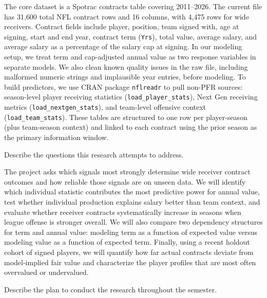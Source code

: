 \documentclass[10pt]{extarticle}
\begin{document}
\noindent The core dataset is a Spotrac contracts table covering 2011--2026. The current file has 31{,}600 total NFL contract rows and 16 columns, with 4{,}475 rows for wide receivers. Contract fields include player, position, team signed with, age at signing, start and end year, contract term (\texttt{Yrs}), total value, average salary, and average salary as a percentage of the salary cap at signing. In our modeling setup, we treat term and cap-adjusted annual value as two response variables in separate models. We also clean known quality issues in the raw file, including malformed numeric strings and implausible year entries, before modeling. To build predictors, we use CRAN package \texttt{nflreadr} to pull non-PFR sources: season-level player receiving statistics (\texttt{load\_player\_stats}), Next Gen receiving metrics (\texttt{load\_nextgen\_stats}), and team-level offensive context (\texttt{load\_team\_stats}). These tables are structured to one row per player-season (plus team-season context) and linked to each contract using the prior season as the primary information window.

\begin{problem}
[IV. Questions]
Describe the questions this research attempts to address.
\end{problem}

\noindent The project asks which signals most strongly determine wide receiver contract outcomes and how reliable those signals are on unseen data. We will identify which individual statistic contributes the most predictive power for annual value, test whether individual production explains salary better than team context, and evaluate whether receiver contracts systematically increase in seasons when league offense is stronger overall. We will also compare two dependency structures for term and annual value: modeling term as a function of expected value versus modeling value as a function of expected term. Finally, using a recent holdout cohort of signed players, we will quantify how far actual contracts deviate from model-implied fair value and characterize the player profiles that are most often overvalued or undervalued.

\begin{problem}
[V. Plan]
Describe the plan to conduct the research throughout the semester.
\end{problem}
\end{document}
